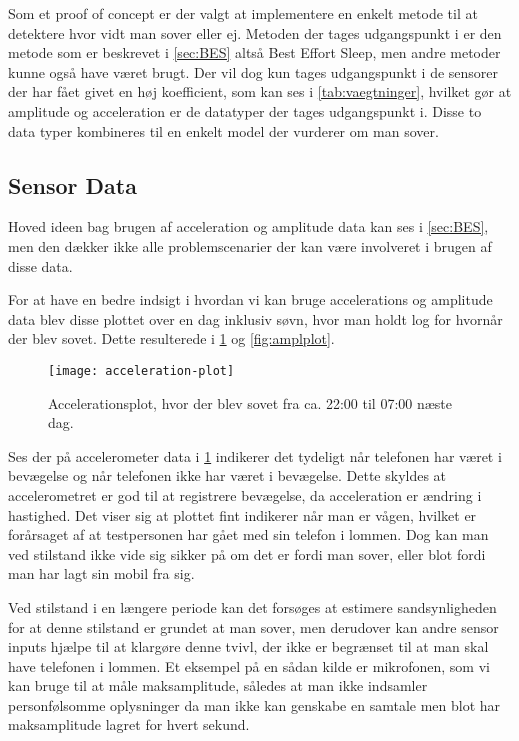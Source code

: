 Som et proof of concept er der valgt at implementere en enkelt metode til at detektere hvor vidt man sover eller ej.
Metoden der tages udgangspunkt i er den metode som er beskrevet i \cref{sec:BES} altså Best Effort Sleep, men andre metoder kunne også have været brugt.
Der vil dog kun tages udgangspunkt i de sensorer der har fået givet en høj koefficient, som kan ses i \cref{tab:vaegtninger}, hvilket gør at amplitude og acceleration er de datatyper der tages udgangspunkt i.
Disse to data typer kombineres til en enkelt model der vurderer om man sover.

\subsection{Sensor Data}
Hoved ideen bag brugen af acceleration og amplitude data kan ses i \cref{sec:BES}, men den dækker ikke alle problemscenarier der kan være involveret i brugen af disse data.

For at have en bedre indsigt i hvordan vi kan bruge accelerations og amplitude data blev disse plottet over en dag inklusiv søvn, hvor man holdt log for hvornår der blev sovet.
Dette resulterede i \cref{fig:accplot} og \cref{fig:amplplot}.

\begin{figure}[h]
	\centering
	\texttt{[image: acceleration-plot]}
	\caption{Accelerationsplot, hvor der blev sovet fra ca. 22:00 til 07:00 næste dag.}\label{fig:accplot}
\end{figure}


Ses der på accelerometer data i \cref{fig:accplot} indikerer det tydeligt når telefonen har været i bevægelse og når telefonen ikke har været i bevægelse.
Dette skyldes at accelerometret er god til at registrere bevægelse, da acceleration er ændring i hastighed.
Det viser sig at plottet fint indikerer når man er vågen, hvilket er forårsaget af at testpersonen har gået med sin telefon i lommen.
Dog kan man ved stilstand ikke vide sig sikker på om det er fordi man sover, eller blot fordi man har lagt sin mobil fra sig.

Ved stilstand i en længere periode kan det forsøges at estimere sandsynligheden for at denne stilstand er grundet at man sover, men derudover kan andre sensor inputs hjælpe til at klargøre denne tvivl, der ikke er begrænset til at man skal have telefonen i lommen.
Et eksempel på en sådan kilde er mikrofonen, som vi kan bruge til at måle maksamplitude, således at man ikke indsamler personfølsomme oplysninger da man ikke kan genskabe en samtale men blot har maksamplitude lagret for hvert sekund.

